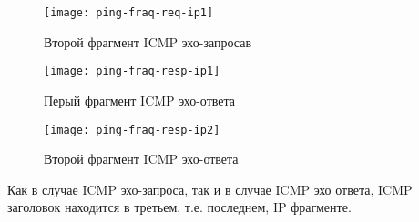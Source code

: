 \begin{figure}[H]
	\centering
	\texttt{[image: ping-fraq-req-ip1]}
	\caption{Второй фрагмент ICMP эхо-запросав}
	\label{fig:ping-fraq-req-ip2}
\end{figure}

\begin{figure}[H]
	\centering
	\texttt{[image: ping-fraq-resp-ip1]}
	\caption{Перый фрагмент ICMP эхо-ответа}
	\label{fig:ping-fraq-resp-ip1}
\end{figure}

\begin{figure}[H]
	\centering
	\texttt{[image: ping-fraq-resp-ip2]}
	\caption{Второй фрагмент ICMP эхо-ответа}
	\label{fig:ping-fraq-resp-ip2}
\end{figure}

Как в случае ICMP эхо-запроса, так и в случае ICMP эхо ответа, ICMP заголовок находится в третьем, т.е. последнем, IP фрагменте.


